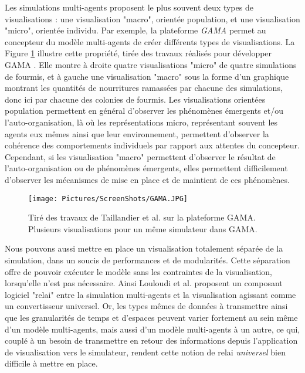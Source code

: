 		Les simulations multi-agents proposent le plus souvent deux types de visualisations : une visualisation "macro", orientée population, et une visualisation "micro", orientée individu. Par exemple, la plateforme \textit{GAMA} \cite{taillandier_building_2019} permet au concepteur du modèle multi-agents de créer différents types de visualisations. La Figure \ref{GAMA} illustre cette propriété, tirée des travaux réalisés pour développer GAMA \cite{taillandier_building_2019}. Elle montre à droite quatre visualisations "micro" de quatre simulations de fourmis, et à gauche une visualisation "macro" sous la forme d'un graphique montrant les quantités de nourritures ramassées par chacune des simulations, donc ici par chacune des colonies de fourmis.
		Les visualisations orientées population permettent en général d'observer les phénomènes émergents et/ou l'auto-organisation, là où les représentations micro, représentant souvent les agents eux mêmes ainsi que leur environnement, permettent d'observer la cohérence des comportements individuels par rapport aux attentes du concepteur. Cependant, si les visualisation "macro" permettent d'observer le résultat de l'auto-organisation ou de phénomènes émergents, elles permettent difficilement d'observer les mécanismes de mise en place et de maintient de ces phénomènes.
		
		\begin{figure}
			\centering
			\texttt{[image: Pictures/ScreenShots/GAMA.JPG]}
			\caption{Tiré des travaux de Taillandier et al. \cite{taillandier_building_2019} sur la plateforme GAMA. Plusieurs visualisations pour un même simulateur dans GAMA.}
			\label{GAMA}
		\end{figure}
		
		Nous pouvons aussi mettre en place un visualisation totalement séparée de la simulation, dans un soucis de performances et de modularités. Cette séparation offre de pouvoir exécuter le modèle sans les contraintes de la visualisation, lorsqu'elle n'est pas nécessaire. Ainsi Louloudi et al. \cite{louloudi_new_2012} proposent un composant logiciel "relai" entre la simulation multi-agents et la visualisation agissant comme un convertisseur universel.
		Or, les types mêmes de données à transmettre ainsi que les granularités de temps et d'espaces peuvent varier fortement au sein même d'un modèle multi-agents, mais aussi d'un modèle multi-agents à un autre, ce qui, couplé à un besoin de transmettre en retour des informations depuis l'application de visualisation vers le simulateur, rendent cette notion de relai \textit{universel} bien difficile à mettre en place.
		
